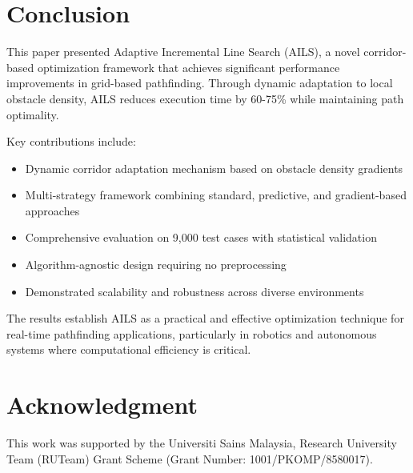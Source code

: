 \documentclass[journal]{IEEEtran}
\begin{document}
\section{Conclusion}

This paper presented Adaptive Incremental Line Search (AILS), a novel corridor-based optimization framework that achieves significant performance improvements in grid-based pathfinding. Through dynamic adaptation to local obstacle density, AILS reduces execution time by 60-75\% while maintaining path optimality.

Key contributions include:
\begin{itemize}
\item Dynamic corridor adaptation mechanism based on obstacle density gradients
\item Multi-strategy framework combining standard, predictive, and gradient-based approaches
\item Comprehensive evaluation on 9,000 test cases with statistical validation
\item Algorithm-agnostic design requiring no preprocessing
\item Demonstrated scalability and robustness across diverse environments
\end{itemize}

The results establish AILS as a practical and effective optimization technique for real-time pathfinding applications, particularly in robotics and autonomous systems where computational efficiency is critical.

\section*{Acknowledgment}
This work was supported by the Universiti Sains Malaysia, Research University Team (RUTeam) Grant Scheme (Grant Number: 1001/PKOMP/8580017).



\end{document}

